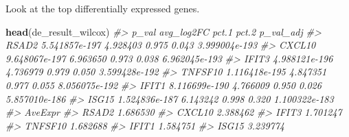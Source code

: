 \documentclass[
]{book}
\newenvironment{Shaded}{\begin{snugshade}}{\end{snugshade}}
\newcommand{\AttributeTok}[1]{\textcolor[rgb]{0.13,0.29,0.53}{#1}}
\newcommand{\CommentTok}[1]{\textcolor[rgb]{0.56,0.35,0.01}{\textit{#1}}}
\newcommand{\DecValTok}[1]{\textcolor[rgb]{0.00,0.00,0.81}{#1}}
\newcommand{\FunctionTok}[1]{\textcolor[rgb]{0.13,0.29,0.53}{\textbf{#1}}}
\newcommand{\NormalTok}[1]{#1}
\newcommand{\OtherTok}[1]{\textcolor[rgb]{0.56,0.35,0.01}{#1}}
\newcommand{\SpecialCharTok}[1]{\textcolor[rgb]{0.81,0.36,0.00}{\textbf{#1}}}
\newcommand{\StringTok}[1]{\textcolor[rgb]{0.31,0.60,0.02}{#1}}
\begin{document}
\begin{Shaded}
\end{Shaded}

Look at the top differentially expressed genes.

\begin{Shaded}
\begin{Highlighting}[]
\FunctionTok{head}\NormalTok{(de\_result\_wilcox)}
\CommentTok{\#\textgreater{}                 p\_val avg\_log2FC pct.1 pct.2     p\_val\_adj}
\CommentTok{\#\textgreater{} RSAD2   5.541857e{-}197   4.928403 0.975 0.043 3.999004e{-}193}
\CommentTok{\#\textgreater{} CXCL10  9.648067e{-}197   6.963650 0.973 0.038 6.962045e{-}193}
\CommentTok{\#\textgreater{} IFIT3   4.988121e{-}196   4.736979 0.979 0.050 3.599428e{-}192}
\CommentTok{\#\textgreater{} TNFSF10 1.116418e{-}195   4.847351 0.977 0.055 8.056075e{-}192}
\CommentTok{\#\textgreater{} IFIT1   8.116699e{-}190   4.766009 0.950 0.026 5.857010e{-}186}
\CommentTok{\#\textgreater{} ISG15   1.524836e{-}187   6.143242 0.998 0.320 1.100322e{-}183}
\CommentTok{\#\textgreater{}          AveExpr}
\CommentTok{\#\textgreater{} RSAD2   1.686530}
\CommentTok{\#\textgreater{} CXCL10  2.388462}
\CommentTok{\#\textgreater{} IFIT3   1.701247}
\CommentTok{\#\textgreater{} TNFSF10 1.682688}
\CommentTok{\#\textgreater{} IFIT1   1.584751}
\CommentTok{\#\textgreater{} ISG15   3.239774}
\end{Highlighting}
\end{Shaded}
\end{document}
